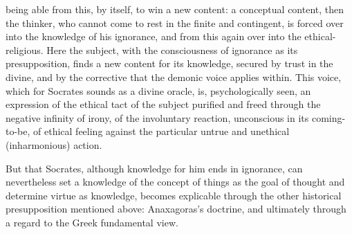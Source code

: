 being able from this, by itself, to win a new content:
a conceptual content, then the thinker, who cannot
come to rest in the finite and contingent, is forced over into the knowledge of his ignorance, and from this again over into the ethical-religious.
Here the subject, with the consciousness of ignorance
as its presupposition, finds a new content for its knowledge, secured by
trust in the divine, and by the corrective that the
demonic voice applies within. This voice,
which for Socrates sounds as a divine oracle, is, psychologically seen, an expression of the ethical tact of the subject purified and freed through the negative
infinity of irony, of the involuntary reaction, unconscious in its coming-to-be, of ethical feeling against the particular untrue and unethical (inharmonious) action.

But that Socrates, although knowledge for him ends in ignorance, can nevertheless set a knowledge of the concept of things as
the goal of thought and determine virtue as knowledge, becomes explicable through the other historical presupposition mentioned above:
Anaxagoras's doctrine, and ultimately through a regard to the
Greek fundamental view.

